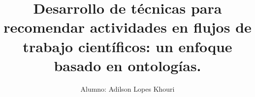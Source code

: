 \documentclass[compress, hyperref={pdfpagelayout=SinglePage}]{beamer}
\title[Presentacion Univ. Andes]{Desarrollo de técnicas para recomendar actividades en flujos de trabajo científicos: un enfoque basado en ontologías.}
\author{Alumno: Adilson Lopes Khouri}
\institute[USP]{Asesor: Prof. Dr. Luciano Antonio Digiampietri}
\begin{document}
\begin{frame}
  \titlepage
\end{frame}











\end{document}

